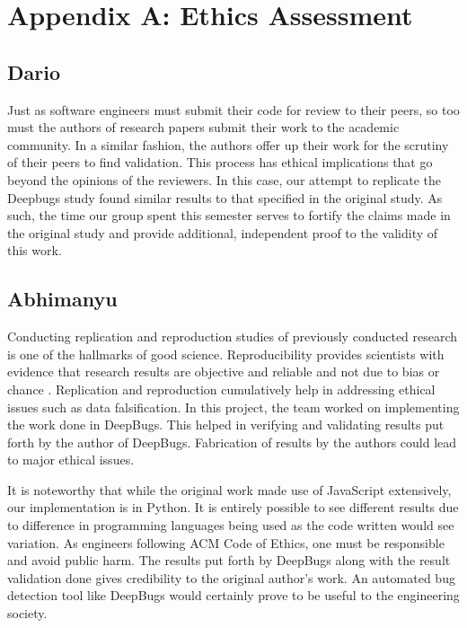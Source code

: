 \section{Appendix A: Ethics Assessment}
\label{sec:appendix_a}
\subsection{Dario}
Just as software engineers must submit their code for review to their peers, so too must the authors of research papers submit their work to the academic community. In a similar fashion, the authors offer up their work for the scrutiny of their peers to find validation. This process has ethical implications that go beyond the opinions of the reviewers. In this case, our attempt to replicate the Deepbugs study found similar results to that specified in the original study. As such, the time our group spent this semester serves to fortify the claims made in the original study and provide additional, independent proof to the validity of this work.


\subsection{Abhimanyu}
Conducting replication and reproduction studies of previously conducted research is one of the hallmarks of good science. Reproducibility provides scientists with evidence that research results are objective and reliable and not due to bias or chance 
\cite{rooney_how_2016}. Replication and reproduction cumulatively help in addressing ethical issues such as data falsification. In this project, the team worked on implementing the work done in DeepBugs. This helped in verifying and validating results put forth by the author of DeepBugs. Fabrication of results by the authors could lead to major ethical issues.

It is noteworthy that while the original work made use of JavaScript extensively, our implementation is in Python. It is entirely possible to see different results due to difference in programming languages being used as the code written would see variation. As engineers following ACM Code of Ethics, one must be responsible and avoid public harm. The results put forth by DeepBugs along with the result validation done gives credibility to the original author's work. An automated bug detection tool like DeepBugs would certainly prove to be useful to the engineering society.


